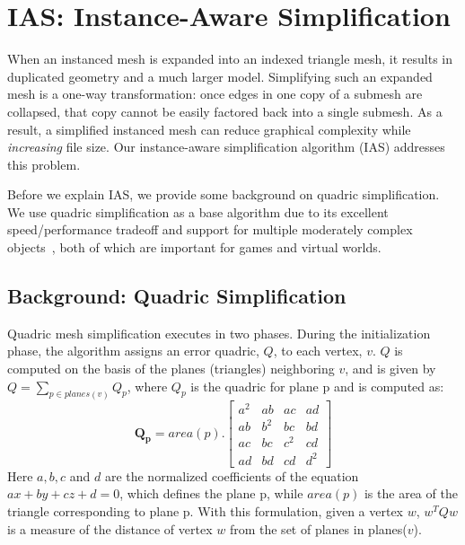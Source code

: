 \section{IAS: Instance-Aware Simplification}
\label{sec:simplification}

When an instanced mesh is expanded
into an indexed triangle mesh, it results in duplicated geometry
and a much larger model. Simplifying such an expanded mesh is a
one-way transformation: once edges in one copy of a submesh are
collapsed, that copy cannot be easily factored back into a single
submesh. As a result, a simplified instanced mesh can reduce graphical
complexity while {\em increasing} file size. Our instance-aware
simplification algorithm (IAS) addresses this problem.

Before we explain IAS, we
provide some background on quadric simplification. 
We use quadric simplification as a base algorithm due to
its excellent speed/performance tradeoff and support for multiple
moderately complex objects~\cite{luebke01developer}, both of which are
important for games and virtual worlds. 



\subsection{Background: Quadric Simplification}

Quadric mesh simplification executes in two
phases. During the initialization phase, the algorithm assigns an error
quadric, $Q$, to each vertex, $v$. $Q$ is computed
on the basis of the planes (triangles) neighboring $v$, and is given by
$Q=\sum_{p \in planes(v)} Q_p$, where
$Q_p$ is the quadric for plane p and is computed as:
\begin{equation}
\label{eq:Qp_equation}
 \mathbf{Q_p} = area(p) . \left[ \begin{array}{cccc}
a^{2} & ab & ac & ad \\
ab & b^{2} & bc & bd \\
ac & bc & c^2 & cd \\
ad & bd & cd & d^2                    \end{array} \right] 
\end{equation}
Here $a, b, c$ and $d$ are the normalized coefficients of the equation
$ax+by+cz+d=0$, which defines the plane p, while $area(p)$ is the area
of the triangle corresponding to plane p.
With this formulation, given a vertex $w$, $w^TQw$
is a measure of the distance of vertex $w$ from the set of planes
in planes($v$).

